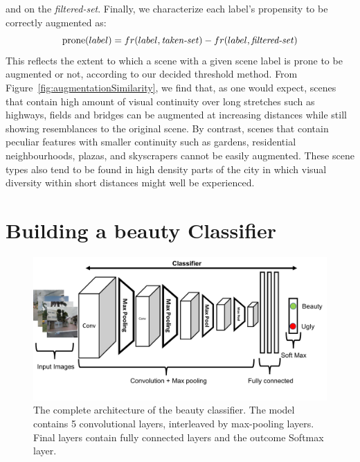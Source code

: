 and on the \emph{filtered-set}. Finally, we characterize each label's propensity to be correctly augmented as:
\begin{equation}
    \textrm{prone}(label)= fr(label,\textrm{\emph{taken-set}}) - fr(label,\textrm{\emph{filtered-set}})
\end{equation} 
This reflects the extent to which a scene with a given scene label is prone to be augmented or not, according to our decided threshold method. From Figure~\ref{fig:augmentationSimilarity}, we find that, as one would expect, scenes that contain high amount of visual continuity over long stretches such as highways, fields and bridges can be augmented at increasing distances while still showing resemblances to the original scene. By contrast, scenes that contain peculiar features with smaller continuity such as gardens, residential neighbourhoods, plazas, and skyscrapers cannot be easily augmented. These scene types also tend to be found in high density parts of the city in which visual diversity within short distances might well be experienced. 

\section{Building a beauty Classifier}

\begin{figure}[t!]
    \centering
    \includegraphics[width=\columnwidth]{Classifier_arch.pdf}
    \caption{The complete architecture of the beauty classifier. The model contains 5 convolutional layers, interleaved by max-pooling layers. Final layers contain fully connected layers and the outcome Softmax layer.}
    \label{fig:classifier_arch}
\end{figure}

